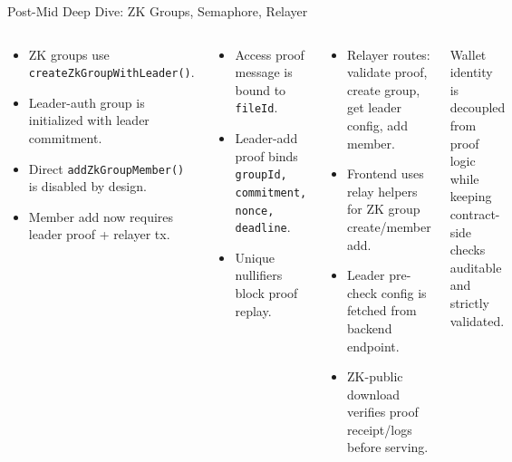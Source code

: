 \documentclass[aspectratio=169]{beamer}
\begin{document}
\begin{frame}{Post-Mid Deep Dive: ZK Groups, Semaphore, Relayer}
\tiny
\begin{columns}[t]
\begin{tcolorbox}[bluebox, title=\textbf{What Changed in Group Model}]
\begin{itemize}
  \setlength{\itemsep}{1.5pt}
  \setlength{\parskip}{0pt}
  \setlength{\parsep}{0pt}
  \item ZK groups use \texttt{createZkGroupWithLeader()}.
  \item Leader-auth group is initialized with leader commitment.
  \item Direct \texttt{addZkGroupMember()} is disabled by design.
  \item Member add now requires leader proof + relayer tx.
\end{itemize}
\end{tcolorbox}
\vspace{0.05cm}
\begin{tcolorbox}[greenbox, title=\textbf{Semaphore Verification Semantics}]
\begin{itemize}
  \setlength{\itemsep}{1.5pt}
  \setlength{\parskip}{0pt}
  \setlength{\parsep}{0pt}
  \item Access proof message is bound to \texttt{fileId}.
  \item Leader-add proof binds \texttt{groupId, commitment, nonce, deadline}.
  \item Unique nullifiers block proof replay.
\end{itemize}
\end{tcolorbox}

\begin{tcolorbox}[orangebox, title=\textbf{Relayer API + Frontend Integration}]
\begin{itemize}
  \setlength{\itemsep}{1.5pt}
  \setlength{\parskip}{0pt}
  \setlength{\parsep}{0pt}
  \item Relayer routes: validate proof, create group, get leader config, add member.
  \item Frontend uses relay helpers for ZK group create/member add.
  \item Leader pre-check config is fetched from backend endpoint.
  \item ZK-public download verifies proof receipt/logs before serving.
\end{itemize}
\end{tcolorbox}
\vspace{0.05cm}
\begin{tcolorbox}[navybox, title=\textbf{Security Outcome}]
Wallet identity is decoupled from proof logic while keeping contract-side checks auditable and strictly validated.
\end{tcolorbox}
\end{columns}
\end{frame}
\end{document}
